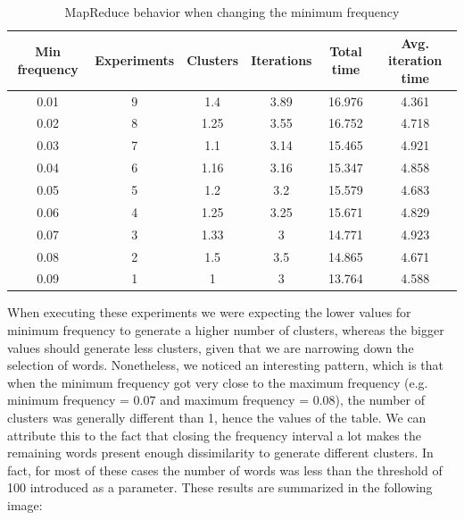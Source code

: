\begin{table}[h!]
	\begin{tabular}{c c c c c c}
		\toprule
		Min frequency & Experiments & Clusters & Iterations & Total time & Avg. iteration time \\
		\midrule
		0.01          & 9           & 1.4      & 3.89       & 16.976     & 4.361               \\
		0.02          & 8           & 1.25     & 3.55       & 16.752     & 4.718               \\
		0.03          & 7           & 1.1      & 3.14       & 15.465     & 4.921               \\
		0.04          & 6           & 1.16     & 3.16       & 15.347     & 4.858               \\
		0.05          & 5           & 1.2      & 3.2        & 15.579     & 4.683               \\
		0.06          & 4           & 1.25     & 3.25       & 15.671     & 4.829               \\
		0.07          & 3           & 1.33     & 3          & 14.771     & 4.923               \\
		0.08          & 2           & 1.5      & 3.5        & 14.865     & 4.671               \\
		0.09          & 1           & 1        & 3          & 13.764     & 4.588               \\
		\bottomrule
	\end{tabular}
	\caption{MapReduce behavior when changing the minimum frequency}
\end{table}

When executing these experiments we were expecting the lower values for minimum frequency to generate a higher number of clusters, whereas the bigger values should generate less clusters, given that we are narrowing down the selection of words. Nonetheless, we noticed an interesting pattern, which is that when the minimum frequency got very close to the maximum frequency (e.g. minimum frequency = 0.07 and maximum frequency = 0.08), the number of clusters was generally different than 1, hence the values of the table. We can attribute this to the fact that closing the frequency interval a lot makes the remaining words present enough dissimilarity to generate different clusters. In fact, for most of these cases the number of words was less than the threshold of 100 introduced as a parameter. These results are summarized in the following image:

